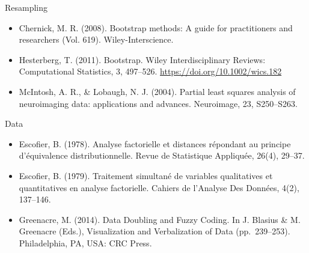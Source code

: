 \documentclass[
  ignorenonframetext,
]{beamer}
\begin{document}
\begin{frame}{Resampling}
\protect\hypertarget{resampling-2}{}

\begin{itemize}[<+->]
\item
  Chernick, M. R. (2008). Bootstrap methods: A guide for practitioners
  and researchers (Vol. 619). Wiley-Interscience.
\item
  Hesterberg, T. (2011). Bootstrap. Wiley Interdisciplinary Reviews:
  Computational Statistics, 3, 497--526.
  \url{https://doi.org/10.1002/wics.182}
\item
  McIntosh, A. R., \& Lobaugh, N. J. (2004). Partial least squares
  analysis of neuroimaging data: applications and advances. Neuroimage,
  23, S250--S263.
\end{itemize}

\end{frame}

\begin{frame}{Data}
\protect\hypertarget{data-1}{}

\begin{itemize}[<+->]
\item
  Escofier, B. (1978). Analyse factorielle et distances répondant au
  principe d'équivalence distributionnelle. Revue de Statistique
  Appliquée, 26(4), 29--37.
\item
  Escofier, B. (1979). Traitement simultané de variables qualitatives et
  quantitatives en analyse factorielle. Cahiers de l'Analyse Des
  Données, 4(2), 137--146.
\item
  Greenacre, M. (2014). Data Doubling and Fuzzy Coding. In J. Blasius \&
  M. Greenacre (Eds.), Visualization and Verbalization of Data
  (pp.~239--253). Philadelphia, PA, USA: CRC Press.
\end{itemize}

\end{frame}
\end{document}
